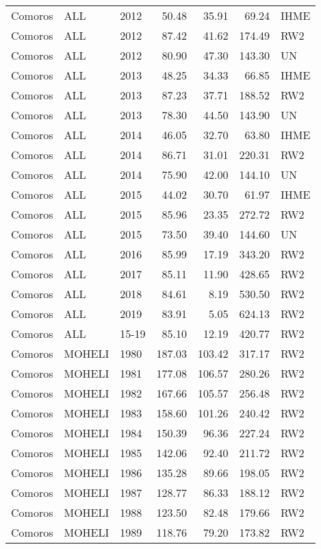 \begin{longtable}{lllrrrl}
  Comoros & ALL & 2012 & 50.48 & 35.91 & 69.24 & IHME \\ 
  Comoros & ALL & 2012 & 87.42 & 41.62 & 174.49 & RW2 \\ 
  Comoros & ALL & 2012 & 80.90 & 47.30 & 143.30 & UN \\ 
  Comoros & ALL & 2013 & 48.25 & 34.33 & 66.85 & IHME \\ 
  Comoros & ALL & 2013 & 87.23 & 37.71 & 188.52 & RW2 \\ 
  Comoros & ALL & 2013 & 78.30 & 44.50 & 143.90 & UN \\ 
  Comoros & ALL & 2014 & 46.05 & 32.70 & 63.80 & IHME \\ 
  Comoros & ALL & 2014 & 86.71 & 31.01 & 220.31 & RW2 \\ 
  Comoros & ALL & 2014 & 75.90 & 42.00 & 144.10 & UN \\ 
  Comoros & ALL & 2015 & 44.02 & 30.70 & 61.97 & IHME \\ 
  Comoros & ALL & 2015 & 85.96 & 23.35 & 272.72 & RW2 \\ 
  Comoros & ALL & 2015 & 73.50 & 39.40 & 144.60 & UN \\ 
  Comoros & ALL & 2016 & 85.99 & 17.19 & 343.20 & RW2 \\ 
  Comoros & ALL & 2017 & 85.11 & 11.90 & 428.65 & RW2 \\ 
  Comoros & ALL & 2018 & 84.61 & 8.19 & 530.50 & RW2 \\ 
  Comoros & ALL & 2019 & 83.91 & 5.05 & 624.13 & RW2 \\ 
  Comoros & ALL & 15-19 & 85.10 & 12.19 & 420.77 & RW2 \\ 
  Comoros & MOHELI & 1980 & 187.03 & 103.42 & 317.17 & RW2 \\ 
  Comoros & MOHELI & 1981 & 177.08 & 106.57 & 280.26 & RW2 \\ 
  Comoros & MOHELI & 1982 & 167.66 & 105.57 & 256.48 & RW2 \\ 
  Comoros & MOHELI & 1983 & 158.60 & 101.26 & 240.42 & RW2 \\ 
  Comoros & MOHELI & 1984 & 150.39 & 96.36 & 227.24 & RW2 \\ 
  Comoros & MOHELI & 1985 & 142.06 & 92.40 & 211.72 & RW2 \\ 
  Comoros & MOHELI & 1986 & 135.28 & 89.66 & 198.05 & RW2 \\ 
  Comoros & MOHELI & 1987 & 128.77 & 86.33 & 188.12 & RW2 \\ 
  Comoros & MOHELI & 1988 & 123.50 & 82.48 & 179.66 & RW2 \\ 
  Comoros & MOHELI & 1989 & 118.76 & 79.20 & 173.82 & RW2 \\ 

\end{longtable}
